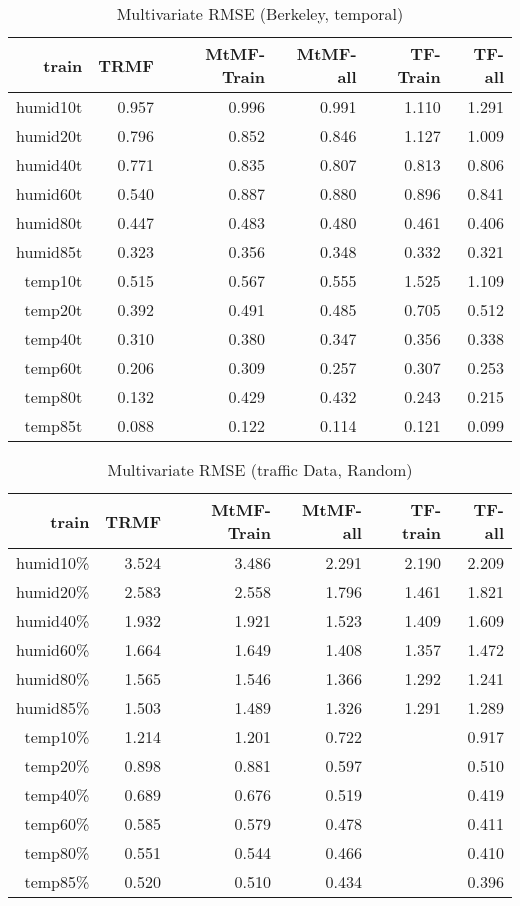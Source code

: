 \begin{table}[htbp]
\setlength{\tabcolsep}{2pt}
\centering
\caption{Multivariate RMSE (Berkeley, temporal)}
\label{table:multi_berkeley_temporal}
\begin{tabular}{r | r r r r r}
train	&TRMF	&MtMF-Train	&MtMF-all &TF-Train&TF-all \\ \hline
humid10t	&0.957&0.996& 	0.991&1.110&1.291\\
humid20t	&0.796&0.852& 	0.846&1.127&1.009\\
humid40t	&0.771&0.835& 	0.807&0.813&0.806\\
humid60t	&0.540&0.887& 	0.880&0.896&0.841\\
humid80t	&0.447&0.483& 	0.480&0.461&0.406\\
humid85t	&0.323&0.356& 	0.348&0.332&0.321\\	\hline
 temp10t	&0.515&0.567& 	0.555&1.525&1.109\\
 temp20t	&0.392&0.491& 	0.485&0.705&0.512\\
 temp40t	&0.310&0.380& 	0.347&0.356&0.338\\
 temp60t	&0.206&0.309& 	0.257&0.307&0.253\\
 temp80t	&0.132&0.429& 	0.432&0.243&0.215\\
 temp85t	&0.088&0.122& 	0.114&0.121&0.099\\
\end{tabular}
\end{table}

\begin{table}[htbp]
\setlength{\tabcolsep}{2pt}
\centering
\caption{Multivariate RMSE (traffic Data, Random)}
\label{table_multi_traffic_random}
\begin{tabular}{r | r r r r r}
train	&TRMF	&MtMF-Train	&MtMF-all &TF-train & TF-all\\ \hline
humid10\%	&3.524 	&3.486 	&2.291&2.190&2.209\\  
humid20\%	&2.583 	&2.558 	&1.796&1.461&1.821\\
humid40\%	&1.932 	&1.921 	&1.523&1.409&1.609\\
humid60\%	&1.664 	&1.649 	&1.408&1.357&1.472\\
humid80\%	&1.565 	&1.546 	&1.366&1.292&1.241\\
humid85\%	&1.503 	&1.489 	&1.326&1.291&1.289\\ \hline
 temp10\%	&1.214 	&1.201 	&0.722&&0.917\\
 temp20\%	&0.898 	&0.881 	&0.597&&0.510\\
 temp40\%	&0.689 	&0.676 	&0.519&&0.419\\
 temp60\%	&0.585 	&0.579 	&0.478&&0.411\\
 temp80\%	&0.551 	&0.544 	&0.466&&0.410\\
 temp85\%	&0.520 	&0.510 	&0.434&&0.396\\
\end{tabular}
\end{table}

